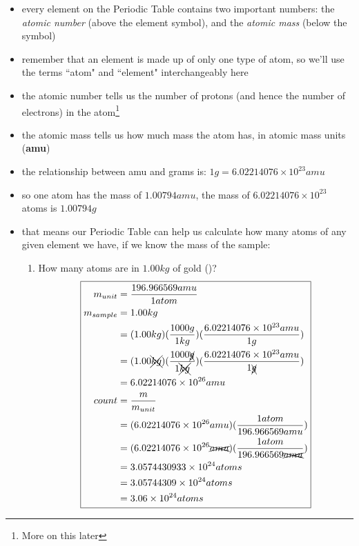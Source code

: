 \documentclass[11pt, oneside]{article}   	%
\begin{document}
\begin{itemize}
\item every element on the Periodic Table contains two important numbers: the \emph{atomic number} (above the element symbol), and the \emph{atomic mass} (below the symbol)
\item remember that an element is made up of only one type of atom, so we'll use the terms ``atom" and ``element" interchangeably here
\item the atomic number tells us the number of protons (and hence the number of electrons) in the atom\footnote{More on this later}
\item the atomic mass tells us how much mass the atom has, in atomic mass units (\textbf{amu})
\item the relationship between amu and grams is: $ 1 g = 6.02214076 \times 10^{23} amu$
\item so one  atom has the mass of $ 1.00794 amu$, the mass of $ 6.02214076 \times 10^{23} $  atoms is $ 1.00794 g$
\item that means our Periodic Table can help us calculate how many atoms of any given element we have, if we know the mass of the sample:
\begin{enumerate}[label=Example \arabic*]
\item How many atoms are in $1.00 kg$ of gold ()? 
\begin{equation} 
\boxed{
\begin{split}
    m_{unit} &= \frac{196.966569 amu}{1 atom} \\
    m_{sample} &= 1.00 kg \\
                        &= ( 1.00 kg ) (\frac{1000 g}{1 kg}) ( \frac{6.02214076 \times 10^{23} amu}{1 g}) \\
                        &= ( 1.00 \xcancel{kg} ) (\frac{1000 \xcancel{g}}{1 \xcancel{kg}}) ( \frac{6.02214076 \times 10^{23} amu}{1 \xcancel{g}}) \\
                        &= 6.02214076 \times 10^{26} amu \\
   count &= \frac{m}{m_{unit}} \\
             &=  (6.02214076 \times 10^{26} amu) (\frac{1 atom}{196.966569 amu}) \\
             &=  (6.02214076 \times 10^{26} \xcancel{amu}) (\frac{1 atom}{196.966569 \xcancel{amu}}) \\
             &=  3.0574430933 \times 10^{24} atoms \\
             &=  3.05744309 \times 10^{24} atoms \\ 
             &=  3.06 \times 10^{24} atoms \\                    
 \end{split}
 }
 \end{equation}
 
\end{enumerate}
\end{itemize}
\end{document}
